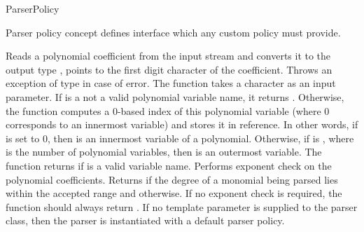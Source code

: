 \begin{ccRefConcept}{ParserPolicy}

\ccDefinition

Parser policy concept defines interface which any custom policy must provide.



\ccTypes


\ccGlue
{}

\ccOperations
{}
{Reads a polynomial coefficient from the input stream  
and converts it to the output type ,  points to the first 
digit character of the coefficient. Throws an exception of type  
in case of error.}\ccGlue
{}
{The function takes a character  as an input parameter.
If  is a not a valid polynomial variable name, it returns .
Otherwise, the function computes a 0-based index of this polynomial variable (where 0 corresponds
to an innermost variable) and stores it in  reference. In other words, if  is set to 0, then  is an innermost variable of a polynomial. Otherwise, if  is , where  is the number of polynomial variables, then  is an outermost variable. 
The function returns  if  is a valid variable name.}\ccGlue
{}
{Performs exponent check on the polynomial coefficients. Returns 
if the degree  of a monomial being parsed lies within the accepted range and  otherwise. If no exponent check is required, the function should always return .}
If no  template parameter is supplied to the parser class,
then the parser is instantiated with a default parser policy.\\ 


\end{ccRefConcept}
